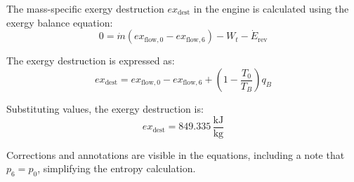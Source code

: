 The mass-specific exergy destruction \( ex_{\text{dest}} \) in the engine is calculated using the exergy balance equation:  
\[
0 = \dot{m} \left( ex_{\text{flow},0} - ex_{\text{flow},6} \right) - W_t - \dot{E}_{\text{rev}}
\]  

The exergy destruction is expressed as:  
\[
ex_{\text{dest}} = ex_{\text{flow},0} - ex_{\text{flow},6} + \left( 1 - \frac{T_0}{T_B} \right) q_B
\]  

Substituting values, the exergy destruction is:  
\[
ex_{\text{dest}} = 849.335 \, \frac{\text{kJ}}{\text{kg}}
\]  

Corrections and annotations are visible in the equations, including a note that \( p_6 = p_0 \), simplifying the entropy calculation.